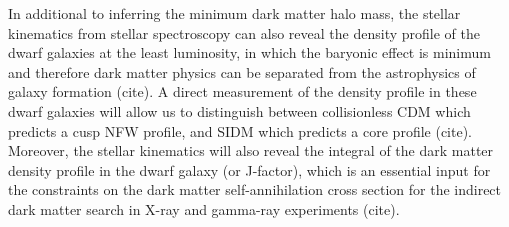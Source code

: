 In additional to inferring the minimum dark matter halo mass, the stellar kinematics from stellar spectroscopy can also reveal the density profile of the dwarf galaxies at the least luminosity, in which the baryonic effect is minimum and therefore dark matter physics can be separated from the astrophysics of galaxy formation (cite). A direct measurement of the density profile in these dwarf galaxies will allow us to distinguish between collisionless CDM  which predicts a cusp NFW profile, and SIDM which predicts a core profile (cite). Moreover, the stellar kinematics will also reveal the integral of the dark matter density profile in the dwarf galaxy (or J-factor), which is an essential input for the constraints on the dark matter self-annihilation cross section for the indirect dark matter search in X-ray and gamma-ray experiments (cite).


